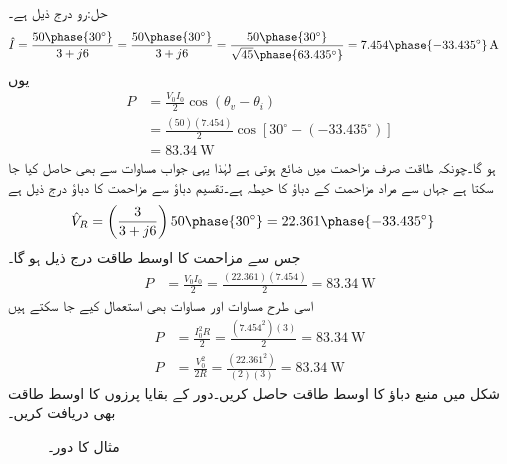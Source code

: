 حل:رو درج ذیل ہے۔
\begin{align*}
\hat{I}&=\frac{50\phase{30^{\circ}}}{3+j6}=\frac{50\phase{30^{\circ}}}{3+j6}=\frac{50\phase{30^{\circ}}}{\sqrt{45}\phase{63.435^{\circ}}}=7.454\phase{-33.435^{\circ}}\,\si{\ampere}
\end{align*}
یوں
\begin{align*}
P&=\frac{V_0 I_0}{2}\cos(\theta_v-\theta_i)\\
&=\frac{(50)(7.454)}{2}\cos[30^{\circ}-(-33.435^{\circ})]\\
&=\SI{83.34}{\watt}
\end{align*}
ہو گا۔چونکہ طاقت صرف مزاحمت میں ضائع ہوتی ہے لہٰذا یہی جواب مساوات  سے بھی حاصل کیا جا سکتا ہے جہاں  سے مراد مزاحمت کے دباؤ کا حیطہ ہے۔تقسیم دباؤ سے مزاحمت کا دباؤ درج ذیل ہے
\begin{align*}
\hat{V}_R&=\left(\frac{3}{3+j6}\right)50\phase{30^{\circ}}=22.361\phase{-33.435^{\circ}}
\end{align*}
جس سے مزاحمت کا اوسط طاقت درج ذیل ہو گا۔
\begin{align*}
P&=\frac{V_0 I_0}{2}=\frac{(22.361)(7.454)}{2}=\SI{83.34}{\watt}
\end{align*}
اسی طرح مساوات  اور مساوات  بھی استعمال کیے جا سکتے ہیں
\begin{align*}
P&=\frac{I^2_0 R}{2}=\frac{(7.454^2)(3)}{2}=\SI{83.34}{\watt}\\
P&=\frac{V^2_0}{2 R}=\frac{(22.361^2)}{(2)(3)}=\SI{83.34}{\watt}
\end{align*}
شکل  میں منبع دباؤ کا اوسط طاقت حاصل کریں۔دور کے بقایا پرزوں کا اوسط طاقت بھی دریافت کریں۔
\begin{figure}
\centering
{}
\caption{مثال  کا دور۔}
\label{شکل_طاقت_مزاحمت_امالہ_ب}
\end{figure} 

